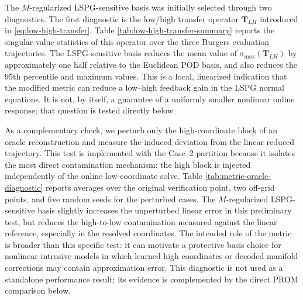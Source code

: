 \documentclass[11pt]{article}
\begin{document}
The $M$-regularized LSPG-sensitive basis was initially selected through two
diagnostics.
The first diagnostic is the low/high transfer operator
$\mathbf T_{LH}$ introduced in \eqref{eq:low-high-transfer}.  Table
\ref{tab:low-high-transfer-summary} reports the singular-value statistics of
this operator over the three Burgers evaluation trajectories.  The
LSPG-sensitive basis reduces the mean value of
$\sigma_{\max}(\mathbf T_{LH})$ by approximately one half relative to the
Euclidean POD basis, and also reduces the 95th percentile and maximum values.
This is a local, linearized indication that the modified metric can reduce a
low--high feedback gain in the LSPG normal equations.  It is not, by itself,
a guarantee of a uniformly smaller nonlinear online response; that question
is tested directly below.

\begin{table}[H]
\centering
\caption{Burgers low/high transfer diagnostic for basis selection. The table reports statistics of $\sigma_{\max}(\mathbf T_{LH})$ and of the corresponding $M$-weighted state gain $g_M$ over the original three evaluation trajectories.}
\label{tab:low-high-transfer-summary}
\resizebox{\textwidth}{!}{%

}
\end{table}

As a complementary check, we perturb only the high-coordinate block of an
oracle reconstruction and measure the induced deviation from the linear
reduced trajectory.  This test is implemented with the Case~2 partition because
it isolates the most direct contamination mechanism: the high block is injected
independently of the online low-coordinate solve.  Table
\ref{tab:metric-oracle-diagnostic} reports averages over the original
verification point, two off-grid points, and five random seeds for the
perturbed cases.
The $M$-regularized LSPG-sensitive basis slightly increases the unperturbed
linear error in this preliminary test, but reduces the high-to-low
contamination measured against the linear reference, especially in the
resolved coordinates.  The intended role of the metric is broader than this
specific test: it can motivate a protective basis choice for nonlinear
intrusive models in which learned high coordinates or decoded manifold
corrections may contain approximation error.  This diagnostic is not used as
a standalone performance result; its evidence is complemented by the direct
PROM comparison below.
\end{document}
